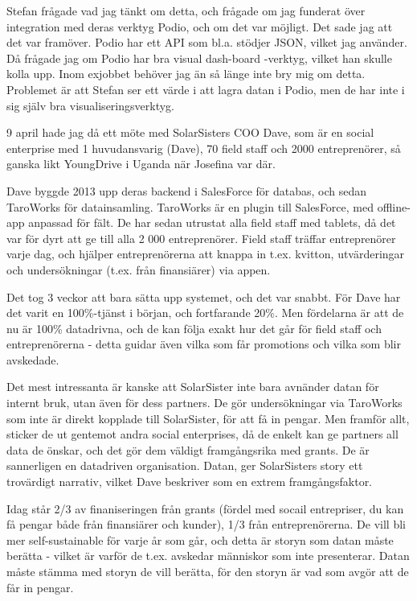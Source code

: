 Stefan frågade vad jag tänkt om detta, och frågade om jag funderat över integration med deras verktyg Podio, och om det var möjligt. Det sade jag att det var framöver. Podio har ett API som bl.a. stödjer JSON, vilket jag använder. Då frågade jag om Podio har bra visual dash-board -verktyg, vilket han skulle kolla upp. Inom exjobbet behöver jag än så länge inte bry mig om detta. Problemet är att Stefan ser ett värde i att lagra datan i Podio, men de har inte i sig själv bra visualiseringsverktyg.

9 april hade jag då ett möte med SolarSisters COO Dave, som är en social enterprise med 1 huvudansvarig (Dave), 70 field staff och 2000 entreprenörer, så ganska likt YoungDrive i Uganda när Josefina var där.

Dave byggde 2013 upp deras backend i SalesForce för databas, och sedan TaroWorks för datainsamling. TaroWorks är en plugin till SalesForce, med offline-app anpassad för fält. De har sedan utrustat alla field staff med tablets, då det var för dyrt att ge till alla 2 000 entreprenörer. Field staff träffar entreprenörer varje dag, och hjälper entreprenörerna att knappa in t.ex. kvitton, utvärderingar och undersökningar (t.ex. från finansiärer) via appen.

Det tog 3 veckor att bara sätta upp systemet, och det var snabbt. För Dave har det varit en 100\%-tjänst i början, och fortfarande 20\%. Men fördelarna är att de nu är 100\% datadrivna, och de kan följa exakt hur det går för field staff och entreprenörerna - detta guidar även vilka som får promotions och vilka som blir avskedade.

Det mest intressanta är kanske att SolarSister inte bara avnänder datan för internt bruk, utan även för dess partners. De gör undersökningar via TaroWorks som inte är direkt kopplade till SolarSister, för att få in pengar. Men framför allt, sticker de ut gentemot andra social enterprises, då de enkelt kan ge partners all data de önskar, och det gör dem väldigt framgångsrika med grants. De är sannerligen en datadriven organisation. Datan, ger SolarSisters story ett trovärdigt narrativ, vilket Dave beskriver som en extrem framgångsfaktor.

Idag står 2/3 av finaniseringen från grants (fördel med socail entrepriser, du kan få pengar både från finansiärer och kunder), 1/3 från entreprenörerna. De vill bli mer self-sustainable för varje år som går, och detta är storyn som datan måste berätta - vilket är varför de t.ex. avskedar människor som inte presenterar. Datan måste stämma med storyn de vill berätta, för den storyn är vad som avgör att de får in pengar.

